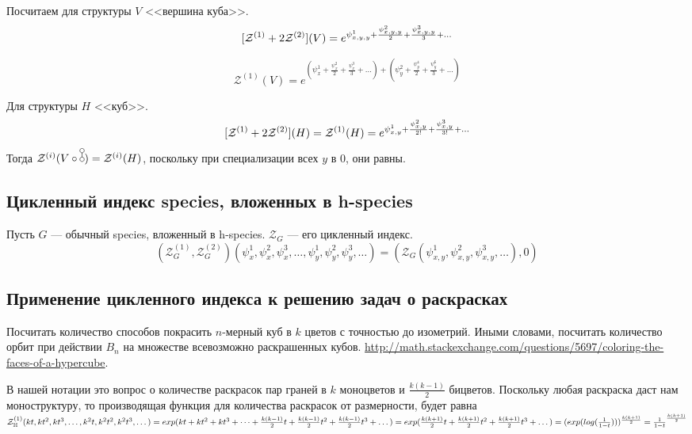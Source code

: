 \begin{example}
Посчитаем для структуры $V$ <<вершина куба>>.
$$
[\mathcal Z^{(1)} + 2\mathcal Z^{(2)}](V) = e^{\psi_{x,y,y}^{1} + \frac{\psi_{x,y,y}^{2}}{2} +
\frac{\psi_{x,y,y}^{3}}{3} + \dots} 
$$

$$
\mathcal Z^{(1)}(V) = e^{(\psi_{x}^{1} + \frac{\psi_{x}^{2}}{2} +
\frac{\psi_{x}^{3}}{3} + \dots) + (\psi_{y}^{2} + \frac{\psi_{y}^{4}}{2} +
\frac{\psi_{y}^{6}}{3} + \dots)} 
$$

Для структуры $H$ <<куб>>.
$$
[\mathcal Z^{(1)} + 2\mathcal Z^{(2)}](H) = \mathcal Z^{(1)}(H) = e^{\psi_{x,y}^{1} +
\frac{\psi_{x,y}^{2}}{2!} + \frac{\psi_{x,y}^{3}}{3!} + \dots} 
$$
Тогда $\mathcal Z^{(i)}(V \circ \dA) = \mathcal Z^{(i)}(H)$, поскольку
при специализации всех $y$ в $0$, они равны.
\end{example}

\subsection{Цикленный индекс species, вложенных в h-species}
\begin{statement}
Пусть $G$ --- обычный species, вложенный в h-species. $\mathcal Z_G$ --- его
цикленный индекс.
$$(\mathcal Z^{(1)}_G, \mathcal Z^{(2)}_G)
(\psi_x^1, \psi_x^2, \psi_x^3, \dots, 
\psi_y^1, \psi_y^2, \psi_y^3, \dots)
 = (\mathcal Z_G(\psi_{x,y}^1, \psi_{x,y}^2, \psi_{x,y}^3, \dots), 0)$$
\end{statement}

\subsection{Применение цикленного индекса к решению задач о раскрасках}
\begin{problem}
Посчитать количество способов покрасить $n$-мерный куб в $k$ цветов с точностью
до изометрий. Иными словами, посчитать количество орбит при действии $B_n$ на
множестве всевозможно раскрашенных кубов. \url{http://math.stackexchange.com/questions/5697/coloring-the-faces-of-a-hypercube}.
\end{problem}
\begin{solution}
В нашей нотации это вопрос о количестве раскрасок пар граней в $k$ моноцветов и
$\frac{k(k-1)}{2}$ бицветов. Поскольку любая раскраска даст нам моноструктуру,
то производящая функция для количества раскрасок от размерности, будет равна
$\mathcal Z^{(1)}_{\mathbb H}(kt, kt^2, kt^3, \dots, k^2t,
k^2t^2, k^2t^3, \dots) = exp(kt + kt^2 + kt^3 + \dots
+ \frac{k(k-1)}{2}t + \frac{k(k-1)}{2}t^2 + \frac{k(k-1)}{2}t^3 + \dots) =
exp(\frac{k(k+1)}{2}t + \frac{k(k+1)}{2}t^2 + \frac{k(k+1)}{2}t^3 + \dots) =
(exp(log(\frac{1}{1-t})))^{\frac{k(k+1)}{2}} = \frac{1}{1-t}^{\frac{k(k+1)}{2}}$
\end{solution}
